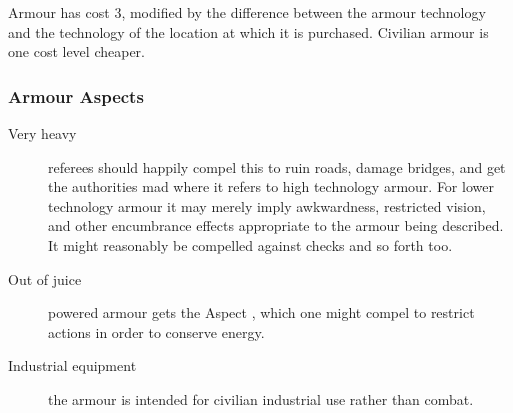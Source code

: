 Armour has cost 3, modified by the difference between the armour technology and the technology of the location at which it is purchased. Civilian armour is one cost level cheaper.

\subsubsection{Armour Aspects}
\label{sec:armour-aspects}

\begin{description}
\item[Very heavy] referees should happily compel this to ruin roads, damage bridges, and get the authorities mad where it refers to high technology armour. For lower technology armour it may merely imply awkwardness, restricted vision, and other encumbrance effects appropriate to the armour being described. It might reasonably be compelled against  checks and so forth too.
\item[Out of juice] powered armour gets the Aspect , which one might compel to restrict actions in order to conserve energy.
\item[Industrial equipment] the armour is intended for civilian industrial use rather than combat.
\end{description}

